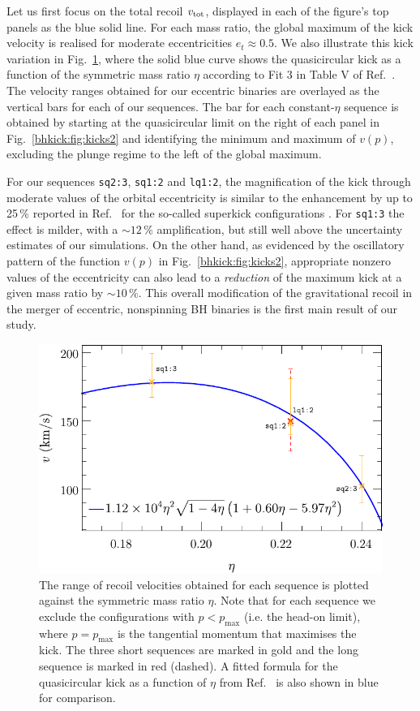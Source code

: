 Let us first focus on the total recoil $v_{\rm tot}$, displayed in each
of the figure's top panels as the blue solid line.  For each mass
ratio, the global maximum of the kick velocity is realised for
moderate eccentricities
$e_t\approx 0.5$.
We also illustrate this kick variation in
Fig.~\ref{bhkick:fig:quasicircular-fit-comparison}, where
the solid blue curve shows the
quasicircular kick as a function
of the symmetric mass ratio $\eta$ according to
Fit 3 in Table V of Ref.~\cite{Healy:2017mvh}. The velocity ranges
obtained for our eccentric binaries are
overlayed as the vertical bars for each of our sequences.
The bar for each constant-$\eta$ sequence
is obtained by starting at the quasicircular limit on the
right of each panel in Fig.~\ref{bhkick:fig:kicks2} and identifying
the minimum and maximum of $v(p)$, excluding the
plunge regime to the left of the global maximum.

For our sequences \texttt{sq2:3}, \texttt{sq1:2} and
\texttt{lq1:2}, the
magnification of the kick through moderate values
of the orbital eccentricity is similar to the
enhancement by up to 25\,\% reported in
Ref.~\cite{Sperhake:2019wwo}
for the so-called superkick configurations
\cite{Gonzalez:2007hi,Campanelli:2007cga}.
For \texttt{sq1:3} the effect is milder, with a
$\sim 12\,\%$ amplification, but still well above
the uncertainty estimates of our simulations.
On the other hand, as evidenced by the oscillatory pattern
of the function $v(p)$ in Fig.~\ref{bhkick:fig:kicks2}, appropriate
nonzero values of the eccentricity can also
lead to a {\it reduction} of the maximum kick at a given mass ratio
by $\sim 10\,\%$.
This overall modification of the gravitational recoil
in the merger of eccentric, nonspinning BH binaries
is the first main result of our study.

\begin{figure}[t]
    \centering
    \includegraphics[width=0.7\columnwidth]{bhkick/quasicircular-fit2.pdf}
    \caption{The range of recoil velocities obtained for each sequence
    is plotted against the symmetric mass ratio $\eta$. Note that for
    each sequence we exclude the configurations with
    $p<p_{\text{max}}$ (i.e. the head-on limit), where
    $p=p_{\text{max}}$ is the tangential momentum that maximises the kick.
    The three short sequences are marked in gold and the long sequence is
    marked in red (dashed). A fitted formula for the quasicircular
    kick as a function of $\eta$ from Ref.~\cite{Healy:2017mvh} is
    also shown in blue for comparison.
    }
    \label{bhkick:fig:quasicircular-fit-comparison}
\end{figure}

